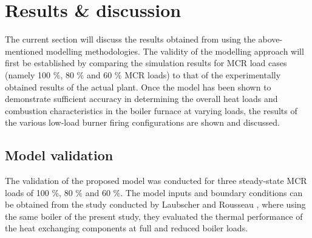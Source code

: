 \documentclass[review]{elsarticle}
\begin{document}
\section{Results \& discussion}
The current section will discuss the results obtained from using the above-mentioned modelling methodologies. The validity of the modelling approach will first be established by comparing the simulation results for MCR load cases (namely 100 \%, 80 \% and 60 \% MCR loads) to that of the experimentally obtained results of the actual plant. Once the model has been shown to demonstrate sufficient accuracy in determining the overall heat loads and combustion characteristics in the boiler furnace at varying loads, the results of the various low-load burner firing configurations are shown and discussed.

\subsection{Model validation}\label{sec_model_valid}
The validation of the proposed model was conducted for three steady-state MCR loads of 100 \%, 80 \% and 60 \%. The model inputs and boundary conditions can be obtained from the study conducted by Laubscher and Rousseau \citep{Laubscher2019b}, where using the same boiler of the present study, they evaluated the thermal performance of the heat exchanging components at full and reduced boiler loads.
\end{document}
